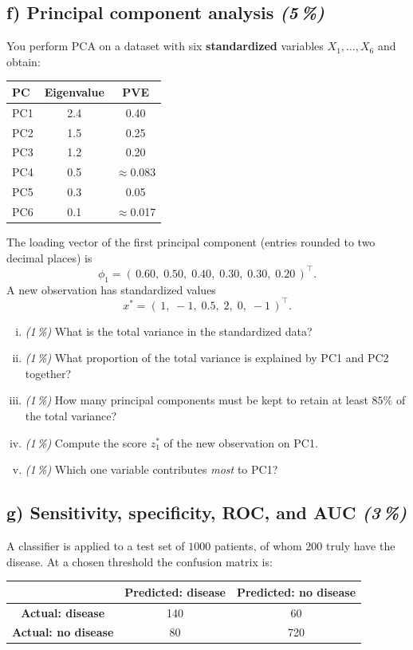 \documentclass[11pt,a4paper]{article}
\newcommand{\subpoints}[1]{\textit{(#1\,\%)}}
\begin{document}
\subsection*{f) Principal component analysis \subpoints{5}}
You perform PCA on a dataset with six \textbf{standardized} variables $X_1, \dots, X_6$ and obtain:
\begin{center}\small
\begin{tabular}{lcc}
\toprule
\textbf{PC} & \textbf{Eigenvalue} & \textbf{PVE} \\
\midrule
PC1 & 2.4 & 0.40 \\
PC2 & 1.5 & 0.25 \\
PC3 & 1.2 & 0.20 \\
PC4 & 0.5 & $\approx$0.083 \\
PC5 & 0.3 & 0.05 \\
PC6 & 0.1 & $\approx$0.017 \\
\bottomrule
\end{tabular}
\end{center}

The loading vector of the first principal component (entries rounded to two decimal places) is
$$\phi_1 = (\,0.60,\; 0.50,\; 0.40,\; 0.30,\; 0.30,\; 0.20\,)^\top.$$
A new observation has standardized values
$$x^* = (\,1,\; -1,\; 0.5,\; 2,\; 0,\; -1\,)^\top.$$

\begin{enumerate}[(i)]
  \item \subpoints{1} What is the total variance in the standardized data?
  \item \subpoints{1} What proportion of the total variance is explained by PC1 and PC2 together?
  \item \subpoints{1} How many principal components must be kept to retain at least $85\%$ of the total variance?
  \item \subpoints{1} Compute the score $z^*_1$ of the new observation on PC1.
  \item \subpoints{1} Which one variable contributes \emph{most} to PC1?
\end{enumerate}

\subsection*{g) Sensitivity, specificity, ROC, and AUC \subpoints{3}}
A classifier is applied to a test set of $1000$ patients, of whom $200$ truly have the disease. At a chosen threshold the confusion matrix is:
\begin{center}\small
\begin{tabular}{c|cc}
 & \textbf{Predicted: disease} & \textbf{Predicted: no disease} \\ \hline
\textbf{Actual: disease}    & 140 & 60 \\
\textbf{Actual: no disease} & 80  & 720 \\
\end{tabular}
\end{center}
\end{document}
